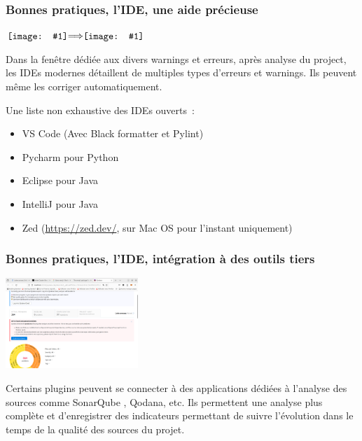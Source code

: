 \documentclass{beamer}
\newcommand*{\vcenterimage}[1]{\vcenter{\hbox{\texttt{[image: \#1]}}}}
\newcommand*{\vcenterarrow}{\vcenter{\hbox{$\Longrightarrow$}}}
\begin{document}
    \begin{frame}
        \transdissolve
        \frametitle{Bonnes pratiques, l'IDE, une aide précieuse}
        \centering

        $\vcenterimage{image/Pycharm-before-analysis.png}\vcenterarrow\vcenterimage{image/Pycharm-after-analysis.png}$

        \bigbreak

        \begin{flushleft}
            Dans la fenêtre dédiée aux divers warnings et erreurs, après analyse du project, les IDEs modernes détaillent de multiples types d'erreurs et warnings.
            Ils peuvent même les corriger automatiquement.

            Une liste non exhaustive des IDEs ouverts~:
            \begin{itemize}
                \item VS Code (Avec Black formatter et Pylint)
                \item Pycharm pour Python
                \item Eclipse pour Java
                \item IntelliJ pour Java
                \item Zed (\url{https://zed.dev/}, sur Mac OS pour l'instant uniquement)
            \end{itemize}
        \end{flushleft}

    \end{frame}

    \begin{frame}
        \transdissolve
        \frametitle{Bonnes pratiques, l'IDE, intégration à des outils tiers}

        \centering
        \includegraphics[width=5cm]{image/Qodana-result.png}

        \bigbreak

        \begin{flushleft}
            Certains plugins peuvent se connecter à des applications dédiées à l'analyse des sources comme SonarQube , Qodana, etc.
            Ils permettent une analyse plus complète et d'enregistrer des indicateurs permettant de suivre l'évolution dans le temps de la qualité des sources du projet.
        \end{flushleft}
    \end{frame}
\end{document}
